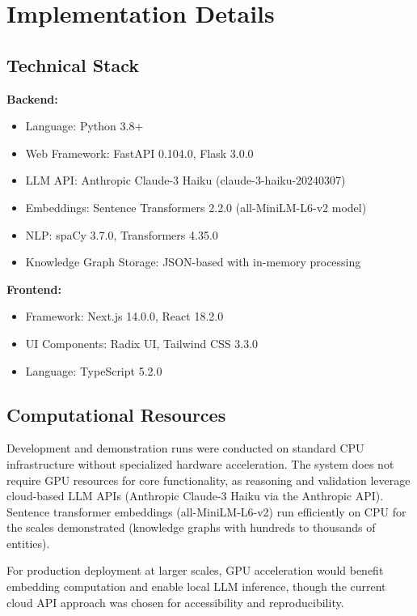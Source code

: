\documentclass{article}
\begin{document}
\appendix

\section{Implementation Details}
\label{appendix:implementation}

\subsection{Technical Stack}

\textbf{Backend:}
\begin{itemize}
\item Language: Python 3.8+
\item Web Framework: FastAPI 0.104.0, Flask 3.0.0
\item LLM API: Anthropic Claude-3 Haiku (claude-3-haiku-20240307)
\item Embeddings: Sentence Transformers 2.2.0 (all-MiniLM-L6-v2 model)
\item NLP: spaCy 3.7.0, Transformers 4.35.0
\item Knowledge Graph Storage: JSON-based with in-memory processing
\end{itemize}

\textbf{Frontend:}
\begin{itemize}
\item Framework: Next.js 14.0.0, React 18.2.0
\item UI Components: Radix UI, Tailwind CSS 3.3.0
\item Language: TypeScript 5.2.0
\end{itemize}

\subsection{Computational Resources}

Development and demonstration runs were conducted on standard CPU infrastructure without specialized hardware acceleration. The system does not require GPU resources for core functionality, as reasoning and validation leverage cloud-based LLM APIs (Anthropic Claude-3 Haiku via the Anthropic API). Sentence transformer embeddings (all-MiniLM-L6-v2) run efficiently on CPU for the scales demonstrated (knowledge graphs with hundreds to thousands of entities).

For production deployment at larger scales, GPU acceleration would benefit embedding computation and enable local LLM inference, though the current cloud API approach was chosen for accessibility and reproducibility.
\end{document}
